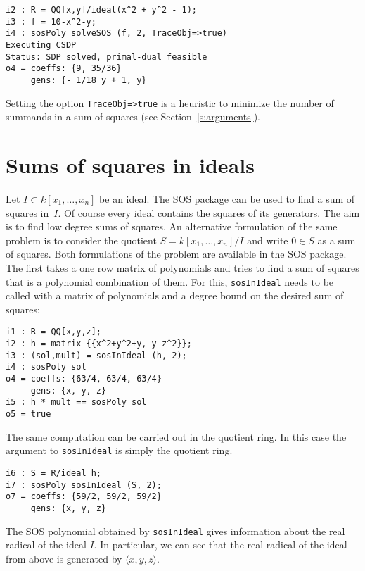 \documentclass[11pt]{amsart}
\theoremstyle{plain}%
\theoremstyle{definition}
\theoremstyle{remark}
\newcommand{\SOS}{\textsc{SOS}\xspace}
\begin{document}
{\small
\begin{verbatim}
i2 : R = QQ[x,y]/ideal(x^2 + y^2 - 1);
i3 : f = 10-x^2-y;
i4 : sosPoly solveSOS (f, 2, TraceObj=>true)
Executing CSDP
Status: SDP solved, primal-dual feasible
o4 = coeffs: {9, 35/36}      
     gens: {- 1/18 y + 1, y} 
\end{verbatim}
}

Setting the option \verb|TraceObj=>true| is a heuristic to minimize the number of summands in a sum of squares (see Section~\ref{s:arguments}).


\section{Sums of squares in ideals}
Let $I \subset k[x_{1},\dots,x_{n}]$ be an ideal.  The \SOS package can be used to find a sum of squares in~$I$.
Of course every ideal contains the squares of its generators.
The aim is to find low degree sums of squares.
An alternative formulation of the same problem is to consider the quotient $S = k[x_{1},\dots,x_{n}]/I$ and write $0\in S$ as a sum of squares.
Both formulations of the problem are available in the \SOS package.
The first takes a one row matrix of polynomials and tries to find a sum of squares that is a polynomial combination of them.
For this, \verb|sosInIdeal| needs to be called with a matrix of polynomials and a degree bound on the desired sum of squares:
{\small
\begin{verbatim}
i1 : R = QQ[x,y,z];
i2 : h = matrix {{x^2+y^2+y, y-z^2}};
i3 : (sol,mult) = sosInIdeal (h, 2);
i4 : sosPoly sol
o4 = coeffs: {63/4, 63/4, 63/4}
     gens: {x, y, z}
i5 : h * mult == sosPoly sol
o5 = true
\end{verbatim}
}
The same computation can be carried out in the quotient ring.
In this case the argument to \verb|sosInIdeal| is simply the quotient ring.
{\small
\begin{verbatim}
i6 : S = R/ideal h;
i7 : sosPoly sosInIdeal (S, 2);
o7 = coeffs: {59/2, 59/2, 59/2}
     gens: {x, y, z}
\end{verbatim}
}
The SOS polynomial obtained by \verb|sosInIdeal| gives information about the real radical of the ideal $I$.
In particular, we can see that the real radical of the ideal from above is generated by $\langle x,y,z\rangle$.
\end{document}
